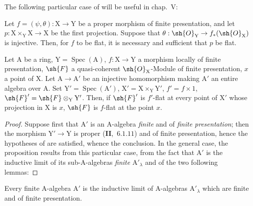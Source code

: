 The following particular case of  will be useful in chap.~V:

\begin{corollary}[11.5.4]
\label{IV.11.5.4}
Let $f=(\psi,\theta):\mathrm{X}\to\mathrm{Y}$ be a proper morphism of finite presentation,
and let $p:\mathrm{X}\times_\mathrm{Y}\mathrm{X}\to\mathrm{X}$ be the first projection. Suppose that $\theta:\sh{O}_\mathrm{Y}\to f_*(\sh{O}_\mathrm{X})$ is injective.
Then, for $f$ to be flat, it is necessary and sufficient that $p$ be flat.
\end{corollary}

\begin{proposition}[11.5.5]
\label{IV.11.5.5}
Let $\mathrm{A}$ be a ring, $\mathrm{Y}=\operatorname{Spec}(\mathrm{A})$, $f:\mathrm{X}\to\mathrm{Y}$ a morphism
locally of finite presentation, $\sh{F}$ a quasi-coherent $\sh{O}_\mathrm{X}$-Module of finite presentation, $x$ a point
of $\mathrm{X}$. Let $\mathrm{A}\to\mathrm{A}'$ be an injective homomorphism making $\mathrm{A}'$ an entire algebra over $\mathrm{A}$. Set
$\mathrm{Y}'=\operatorname{Spec}(\mathrm{A}')$, $\mathrm{X}'=\mathrm{X}\times_\mathrm{Y}\mathrm{Y}'$, $f'=f\times 1$, $\sh{F}'=\sh{F}\otimes_\mathrm{Y}\mathrm{Y}'$. Then, if $\sh{F}'$ is $f'$-flat at every point
of $\mathrm{X}'$ whose projection in $\mathrm{X}$ is $x$, $\sh{F}$ is $f$-flat at the point $x$.
\end{proposition}

\begin{proof}
Suppose first that $\mathrm{A}'$ is an $\mathrm{A}$-algebra \emph{finite} and of \emph{finite presentation}; then the
morphism $\mathrm{Y}'\to\mathrm{Y}$ is proper (\textbf{II},~$6.1.11$) and of finite presentation, hence the hypotheses
of  are satisfied, whence the conclusion. In the general case, the proposition results
from this particular case, from the fact that $\mathrm{A}'$ is the inductive limit of its sub-$\mathrm{A}$-algebras \emph{finite}
$\mathrm{A}'_\lambda$ and of the two following lemmas:
\end{proof}

\begin{lemma}[11.5.5.1]
\label{IV.11.5.5.1}
Every finite $\mathrm{A}$-algebra $\mathrm{A}'$ is the inductive limit of $\mathrm{A}$-algebras $\mathrm{A}'_\lambda$
which are finite and of finite presentation.
\end{lemma}

